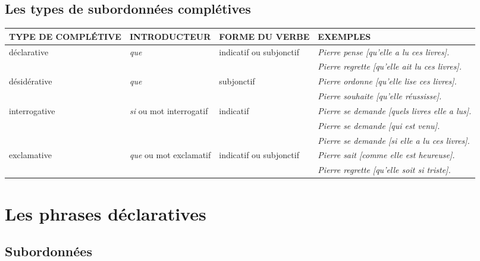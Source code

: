 \documentclass[UTF8]{report}
\begin{document}
\subsection{Les types de subordonnées complétives}


\begin{table}[H]
\centering
\begin{adjustbox}{max width=\textwidth}
    \begin{tabular}{|l|l|l|p{}|}
    \hline
    \rowcolor{cyan!20}
    \textbf{TYPE DE COMPLÉTIVE} & \textbf{INTRODUCTEUR} & \textbf{FORME DU VERBE} & \textbf{EXEMPLES} \\
    \hline
    déclarative & \textit{que} & indicatif ou subjonctif & \textit{Pierre pense [qu'elle a lu ces livres].} \\
    & & & \textit{Pierre regrette [qu'elle ait lu ces livres].} \\
    \hline
    désidérative & \textit{que} & subjonctif & \textit{Pierre ordonne [qu'elle lise ces livres].} \\
    & & & \textit{Pierre souhaite [qu'elle réussisse].} \\
    \hline
    interrogative & \textit{si} ou mot interrogatif & indicatif & \textit{Pierre se demande [quels livres elle a lus].} \\
    & & & \textit{Pierre se demande [qui est venu].} \\
    & & & \textit{Pierre se demande [si elle a lu ces livres].} \\
    \hline
    exclamative & \textit{que} ou mot exclamatif & indicatif ou subjonctif & \textit{Pierre sait [comme elle est heureuse].} \\
    & & & \textit{Pierre regrette [qu'elle soit si triste].} \\
    \hline
    \end{tabular}
\end{adjustbox}
\end{table} 



\section{Les phrases déclaratives}
\subsection{Subordonnées}
\end{document}
